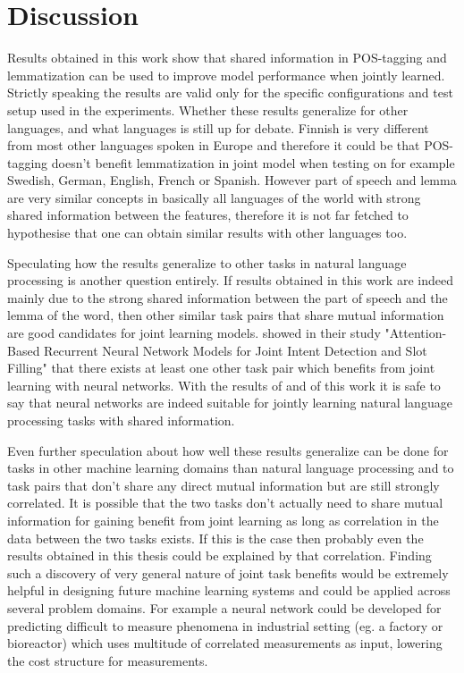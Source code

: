 \documentclass[12pt,a4paper,english
]{tutthesis}
\begin{document}
\chapter{Discussion}
\label{ch:discussion}
Results obtained in this work show that shared information in POS-tagging and lemmatization can be used to improve model performance when jointly learned. Strictly speaking the results are valid only for the specific configurations and test setup used in the experiments. Whether these results generalize for other languages, and what languages is still up for debate. Finnish is very different from most other languages spoken in Europe and therefore it could be that POS-tagging doesn't benefit lemmatization in joint model when testing on for example Swedish, German, English, French or Spanish. However part of speech and lemma are very similar concepts in basically all languages of the world with strong shared information between the features, therefore it is not far fetched to hypothesise that one can obtain similar results with other languages too.

Speculating how the results generalize to other tasks in natural language processing is another question entirely. If results obtained in this work are indeed mainly due to the strong shared information between the part of speech and the lemma of the word, then other similar task pairs that share mutual information are good candidates for joint learning models. \cite{Liu2016a} showed in their study "Attention-Based Recurrent Neural Network Models for Joint Intent Detection and Slot Filling" that there exists at least one other task pair which benefits from joint learning with neural networks. With the results of \cite{Liu2016a} and of this work it is safe to say that neural networks are indeed suitable for jointly learning natural language processing tasks with shared information.

Even further speculation about how well these results generalize can be done for tasks in other machine learning domains than natural language processing and to task pairs that don't share any direct mutual information but are still strongly correlated. It is possible that the two tasks don't actually need to share mutual information for gaining benefit from joint learning as long as correlation in the data between the two tasks exists. If this is the case then probably even the results obtained in this thesis could be explained by that correlation. Finding such a discovery of very general nature of joint task benefits would be extremely helpful in designing future machine learning systems and could be applied across several problem domains. For example a neural network could be developed for predicting difficult to measure phenomena in industrial setting (eg. a factory or bioreactor) which uses multitude of correlated measurements as input, lowering the cost structure for measurements.
\end{document}
